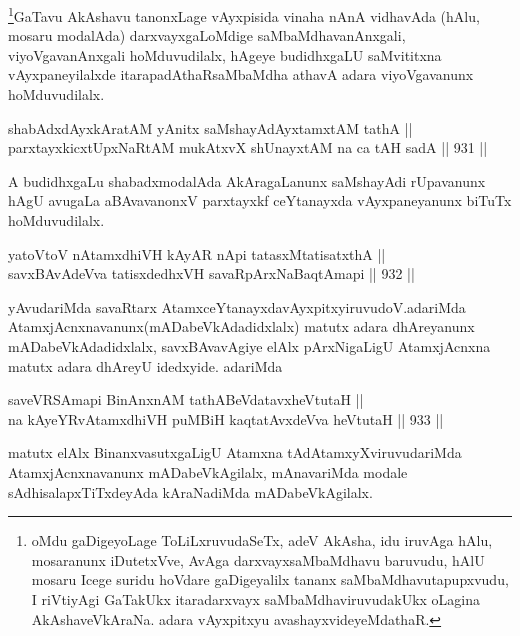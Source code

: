 \begin{artha}
\footnote{oMdu gaDigeyoLage ToLiLxruvudaSeTx, adeV AkAsha, idu iruvAga hAlu, mosaranunx iDutetxVve, AvAga darxvayxsaMbaMdhavu baruvudu, hAlU mosaru Icege suridu hoVdare gaDigeyalilx tananx saMbaMdhavutapupxvudu, I riVtiyAgi GaTakUkx itaradarxvayx saMbaMdhaviruvudakUkx oLagina AkAshaveVkAraNa. adara vAyxpitxyu avashayxvideyeMdathaR.}GaTavu AkAshavu tanonxLage vAyxpisida vinaha nAnA vidhavAda (hAlu, mosaru modalAda) darxvayxgaLoMdige saMbaMdhavanAnxgali, viyoVgavanAnxgali hoMduvudilalx, hAgeye budidhxgaLU saMvititxna vAyxpaneyilalxde itarapadAthaRsaMbaMdha athavA adara viyoVgavanunx hoMduvudilalx.
\end{artha}


\begin{shl}
shabAdxdAyxkAratAM yAnitx saMshayAdAyxtamxtAM tathA ||  \\
parxtayxkicxtUpxNaRtAM mukAtxvX shUnayxtAM na ca tAH sadA \hfill || 931 ||  
\end{shl}

\begin{artha}
A budidhxgaLu shabadxmodalAda AkAragaLanunx saMshayAdi rUpavanunx hAgU avugaLa aBAvavanonxV parxtayxkf ceYtanayxda vAyxpaneyanunx biTuTx hoMduvudilalx.
\end{artha}


\begin{shl}
yatoV\s toV nA\s \s tamxdhiVH kAyAR nApi tatasxMtatisatxthA || \\
savxBAvAdeVva tatisxdedhxVH savaRpArxNaBaqtAmapi \hfill || 932 ||  
\end{shl}

\begin{artha}
yAvudariMda savaRtarx AtamxceYtanayxdavAyxpitxyiruvudoV.\break adariMda AtamxjAcnxnavanunx(mADabeVkAdadidxlalx) matutx adara dhAreyanunx mADabeVkAdadidxlalx, savxBAvavAgiye elAlx pArxNigaLigU AtamxjAcnxna matutx adara dhAreyU idedxyide. adariMda
\end{artha}

\begin{shl}
saveVRSAmapi BinAnxnAM tathA\s BeVdatavxheVtutaH || \\
na kAyeYRvA\s \s tamxdhiVH puMBiH kaqtatAvxdeVva heVtutaH \hfill || 933 ||  
\end{shl}

\begin{artha}
matutx elAlx BinanxvasutxgaLigU Atamxna tAdAtamxyXviruvudariMda AtamxjAcnxnavanunx mADabeVkAgilalx, mAnavariMda modale sAdhisalapxTiTxdeyAda kAraNadiMda mADabeVkAgilalx.
\end{artha}

